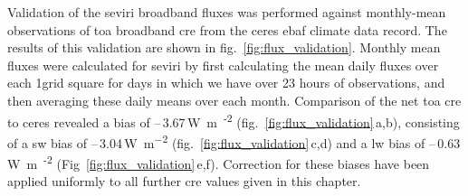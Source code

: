 Validation of the \acrshort{seviri} broadband fluxes was performed against monthly-mean observations of \acrshort{toa} broadband \acrshort{cre} from the \acrfull{ceres} \citep{loeb_clouds_2018} \acrfull{ebaf} climate data record. 
The results of this validation are shown in fig.~\ref{fig:flux_validation}. 
Monthly mean fluxes were calculated for \acrshort{seviri} by first calculating the mean daily fluxes over each 1\textdegree grid square for days in which we have over 23 hours of observations, and then averaging these daily means over each month. 
Comparison of the net \acrshort{toa} \acrshort{cre} to \acrshort{ceres} revealed a bias of --\,3.67\,\unit{W m\textsuperscript{-2}} (fig.~\ref{fig:flux_validation}\,a,b), consisting of a \acrshort{sw} bias of --\,3.04\,\unit{W m^{-2}} (fig.~\ref{fig:flux_validation}\,c,d) and a \acrshort{lw} bias of --\,0.63\,\unit{W m\textsuperscript{-2}} (Fig~\ref{fig:flux_validation}\,e,f). 
Correction for these biases have been applied uniformly to all further \acrshort{cre} values given in this chapter.


